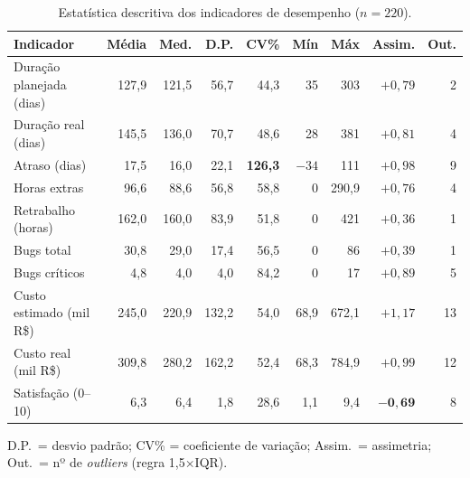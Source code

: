 \documentclass[a4paper, 12pt]{article}
\begin{document}
\begin{table}[H]
\centering
\caption{Estatística descritiva dos indicadores de desempenho ($n=220$).}
\label{tab:desc}
\small
\setlength{\tabcolsep}{5pt}
\begin{tabular}{@{} l rrrrrrrr @{}}
\toprule
\textbf{Indicador} & \textbf{Média} & \textbf{Med.} & \textbf{D.P.} & \textbf{CV\%} & \textbf{Mín} & \textbf{Máx} & \textbf{Assim.} & \textbf{Out.} \\
\midrule
Duração planejada (dias) & 127,9 & 121,5 & 56,7 & 44,3 & 35 & 303 & $+0{,}79$ & 2 \\
Duração real (dias)      & 145,5 & 136,0 & 70,7 & 48,6 & 28 & 381 & $+0{,}81$ & 4 \\
Atraso (dias)            & 17,5 & 16,0 & 22,1 & \textbf{126,3} & $-34$ & 111 & $+0{,}98$ & 9 \\
Horas extras             & 96,6 & 88,6 & 56,8 & 58,8 & 0 & 290,9 & $+0{,}76$ & 4 \\
Retrabalho (horas)       & 162,0 & 160,0 & 83,9 & 51,8 & 0 & 421 & $+0{,}36$ & 1 \\
Bugs total               & 30,8 & 29,0 & 17,4 & 56,5 & 0 & 86 & $+0{,}39$ & 1 \\
Bugs críticos            & 4,8 & 4,0 & 4,0 & 84,2 & 0 & 17 & $+0{,}89$ & 5 \\
Custo estimado (mil R\$) & 245,0 & 220,9 & 132,2 & 54,0 & 68,9 & 672,1 & $+1{,}17$ & 13 \\
Custo real (mil R\$)     & 309,8 & 280,2 & 162,2 & 52,4 & 68,3 & 784,9 & $+0{,}99$ & 12 \\
Satisfação (0--10)       & 6,3 & 6,4 & 1,8 & 28,6 & 1,1 & 9,4 & $\mathbf{-0{,}69}$ & 8 \\
\bottomrule
\end{tabular}

\vspace{2pt}
{\footnotesize D.P.\ = desvio padrão; CV\% = coeficiente de variação;
Assim.\ = assimetria; Out.\ = nº de \emph{outliers} (regra 1,5$\times$IQR).}
\end{table}
\end{document}
